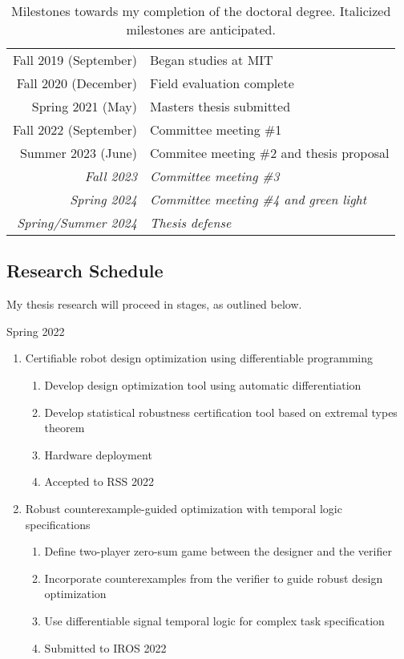\begin{table}[h]
    \centering
    \caption{Milestones towards my completion of the doctoral degree. Italicized milestones are anticipated.}
    \label{ch8:tab:degree_milestones}
    \begin{tabular}{rl}
        Fall 2019 (September)       & Began studies at MIT                           \\
        Fall 2020 (December)        & Field evaluation complete                      \\
        Spring 2021 (May)           & Masters thesis submitted                       \\
        Fall 2022 (September)       & Committee meeting \#1                          \\
        Summer 2023 (June)          & Commitee meeting \#2 and thesis proposal       \\
        \textit{Fall 2023}          & \textit{Committee meeting \#3}                 \\
        \textit{Spring 2024}        & \textit{Committee meeting \#4 and green light} \\
        \textit{Spring/Summer 2024} & \textit{Thesis defense}
    \end{tabular}
\end{table}

\subsection{Research Schedule}

My thesis research will proceed in stages, as outlined below.

Spring 2022
\begin{enumerate}
    \item Certifiable robot design optimization using differentiable programming
          \begin{enumerate}
              \item Develop design optimization tool using automatic differentiation
              \item Develop statistical robustness certification tool based on extremal types theorem
              \item Hardware deployment
              \item Accepted to RSS 2022
          \end{enumerate}
    \item Robust counterexample-guided optimization with temporal logic specifications
          \begin{enumerate}
              \item Define two-player zero-sum game between the designer and the verifier
              \item Incorporate counterexamples from the verifier to guide robust design optimization
              \item Use differentiable signal temporal logic for complex task specification
              \item Submitted to IROS 2022
          \end{enumerate}
\end{enumerate}

